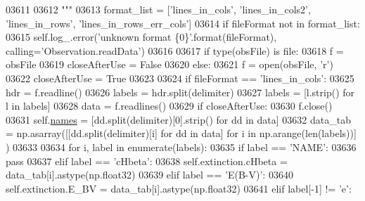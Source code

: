 \begin{DoxyCode}
03611 \textcolor{stringliteral}{}
03612 \textcolor{stringliteral}{        """}    
03613         format\_list = [\textcolor{stringliteral}{'lines\_in\_cols'}, \textcolor{stringliteral}{'lines\_in\_cols2'}, \textcolor{stringliteral}{'lines\_in\_rows'}, \textcolor{stringliteral}{'lines\_in\_rows\_err\_cols'}]
03614         \textcolor{keywordflow}{if} fileFormat \textcolor{keywordflow}{not} \textcolor{keywordflow}{in} format\_list:
03615             self.log\_.error(\textcolor{stringliteral}{'unknown format \{0\}'}.format(fileFormat), calling=\textcolor{stringliteral}{'Observation.readData'})
03616 
03617         \textcolor{keywordflow}{if} type(obsFile) \textcolor{keywordflow}{is} file:
03618             f = obsFile
03619             closeAfterUse = \textcolor{keyword}{False}
03620         \textcolor{keywordflow}{else}:
03621             f = open(obsFile, \textcolor{stringliteral}{'}\textcolor{stringliteral}{r')}
03622 \textcolor{stringliteral}{            closeAfterUse = }\textcolor{keyword}{True}
03623             
03624         \textcolor{keywordflow}{if} fileFormat == \textcolor{stringliteral}{'lines\_in\_cols'}:
03625             hdr = f.readline()
03626             labels = hdr.split(delimiter)
03627             labels = [l.strip() \textcolor{keywordflow}{for} l \textcolor{keywordflow}{in} labels]
03628             data = f.readlines()
03629             \textcolor{keywordflow}{if} closeAfterUse:
03630                 f.close()
03631             self.\hyperlink{classpyneb_1_1core_1_1pynebcore_1_1_observation_a3f365d0b1488b2eba300bf71caf23c17}{names} = [dd.split(delimiter)[0].strip() \textcolor{keywordflow}{for} dd \textcolor{keywordflow}{in} data]
03632             data\_tab = np.asarray([[dd.split(delimiter)[i] \textcolor{keywordflow}{for} dd \textcolor{keywordflow}{in} data] \textcolor{keywordflow}{for} i \textcolor{keywordflow}{in} np.arange(len(labels))]
      )
03633             
03634             \textcolor{keywordflow}{for} i, label \textcolor{keywordflow}{in} enumerate(labels):
03635                 \textcolor{keywordflow}{if} label == \textcolor{stringliteral}{'NAME'}:
03636                     \textcolor{keywordflow}{pass}
03637                 \textcolor{keywordflow}{elif} label == \textcolor{stringliteral}{'cHbeta'}:
03638                     self.extinction.cHbeta = data\_tab[i].astype(np.float32)
03639                 \textcolor{keywordflow}{elif} label == \textcolor{stringliteral}{'E(B-V)'}:
03640                     self.extinction.E\_BV = data\_tab[i].astype(np.float32)         
03641                 \textcolor{keywordflow}{elif} label[-1] != \textcolor{stringliteral}{'e'}:

\end{DoxyCode}

